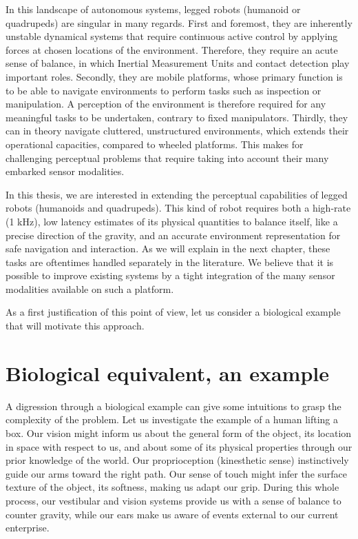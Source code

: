 In this landscape of autonomous systems, legged robots  (humanoid or quadrupeds) are singular in many regards. 
First and foremost, they are inherently unstable dynamical systems that require continuous active control by applying forces at chosen locations of the environment. 
Therefore, they require an acute sense of balance, in which Inertial Measurement Units and contact detection play important roles. 
Secondly, they are mobile platforms, whose primary function is to be able to navigate environments to perform tasks such as inspection or manipulation.
A perception of the environment is therefore required for any meaningful tasks to be undertaken, contrary to fixed manipulators.
Thirdly, they can in theory navigate cluttered, unstructured environments, which extends their operational capacities, compared to wheeled platforms.
This makes for challenging perceptual problems that require taking into account their many embarked sensor modalities.

In this thesis, we are interested in extending the perceptual capabilities of legged robots (humanoids and quadrupeds). This kind of robot requires both a high-rate (1 kHz),
low latency estimates of its physical quantities to balance itself, like a precise direction of the gravity, 
and an accurate environment representation for safe navigation and interaction.
As we will explain in the next chapter, these tasks are oftentimes handled separately in the literature. We believe that it is possible to improve existing systems by a tight integration of the
many sensor modalities available on such a platform.

As a first justification of this point of view, let us consider a biological example that will motivate this approach.


\section{Biological equivalent, an example}

A digression through a biological example can give some intuitions to grasp the complexity of the problem. 
Let us investigate the example of a human lifting a box. Our vision might inform us about the general form of the object, 
its location in space with respect to us, and about some of its physical properties through our prior knowledge of the world. Our proprioception (kinesthetic sense) 
instinctively guide our arms toward the right path. Our sense of touch might infer the surface texture of the object,  its softness, making us 
adapt our grip. During this whole process, our vestibular and vision systems provide us with a sense of balance to counter gravity, while our ears 
make us aware of events external to our current enterprise.


